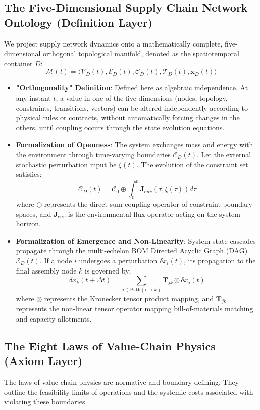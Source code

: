 \documentclass[11pt,a4paper]{article}
\begin{document}
\subsection{The Five-Dimensional Supply Chain Network Ontology (Definition Layer)}
We project supply network dynamics onto a mathematically complete, five-dimensional orthogonal topological manifold, denoted as the spatiotemporal container $D$:
$$\mathcal{M}(t) = \langle \mathcal{V}_D(t), \mathcal{E}_D(t), \mathcal{C}_D(t), \mathcal{T}_D(t), \mathbf{x}_D(t) \rangle$$
\begin{itemize}
    \item \textbf{"Orthogonality" Definition}: Defined here as algebraic independence. At any instant $t$, a value in one of the five dimensions (nodes, topology, constraints, transitions, vectors) can be altered independently according to physical rules or contracts, without automatically forcing changes in the others, until coupling occurs through the state evolution equations.
    \item \textbf{Formalization of Openness}: The system exchanges mass and energy with the environment through time-varying boundaries $\mathcal{C}_D(t)$. Let the external stochastic perturbation input be $\xi(t)$. The evolution of the constraint set satisfies:
    $$\mathcal{C}_D(t) = \mathcal{C}_0 \oplus \int_0^t \mathbf{J}_{env}(\tau, \xi(\tau)) d\tau$$
    where $\oplus$ represents the direct sum coupling operator of constraint boundary spaces, and $\mathbf{J}_{env}$ is the environmental flux operator acting on the system horizon.
    \item \textbf{Formalization of Emergence and Non-Linearity}: System state cascades propagate through the multi-echelon BOM Directed Acyclic Graph (DAG) $\mathcal{E}_D(t)$. If a node $i$ undergoes a perturbation $\delta x_i(t)$, its propagation to the final assembly node $k$ is governed by:
    $$\delta x_k(t + \Delta t) = \sum_{j \in \text{Path}(i \to k)} \mathbf{T}_{jk} \otimes \delta x_j(t)$$
    where $\otimes$ represents the Kronecker tensor product mapping, and $\mathbf{T}_{jk}$ represents the non-linear tensor operator mapping bill-of-materials matching and capacity allotments.
\end{itemize}

\subsection{The Eight Laws of Value-Chain Physics (Axiom Layer)}
The laws of value-chain physics are normative and boundary-defining. They outline the feasibility limits of operations and the systemic costs associated with violating these boundaries.
\end{document}

